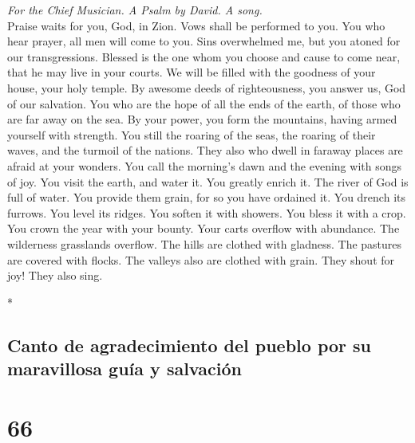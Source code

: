 \begin{paracol}{2}
\begin{otherlanguage}{english}
\emph{For the Chief Musician. A Psalm by David. A song.}\\
 Praise waits for you, God, in Zion. Vows shall be
performed to you.  You who hear prayer, all men will come
to you.  Sins overwhelmed me, but you atoned for our
transgressions.  Blessed is the one whom you choose and
cause to come near, that he may live in your courts. We will be filled
with the goodness of your house, your holy temple.  By
awesome deeds of righteousness, you answer us, God of our salvation. You
who are the hope of all the ends of the earth, of those who are far away
on the sea.  By your power, you form the mountains, having
armed yourself with strength.  You still the roaring of
the seas, the roaring of their waves, and the turmoil of the nations.
 They also who dwell in faraway places are afraid at your
wonders. You call the morning's dawn and the evening with songs of joy.
 You visit the earth, and water it. You greatly enrich it.
The river of God is full of water. You provide them grain, for so you
have ordained it.  You drench its furrows. You level its
ridges. You soften it with showers. You bless it with a crop.
 You crown the year with your bounty. Your carts overflow
with abundance.  The wilderness grasslands overflow. The
hills are clothed with gladness.  The pastures are
covered with flocks. The valleys also are clothed with grain. They shout
for joy! They also sing.

\end{otherlanguage}

\switchcolumn[0]*

\hypertarget{canto-de-agradecimiento-del-pueblo-por-su-maravillosa-guuxeda-y-salvaciuxf3n}{%
\subsection{Canto de agradecimiento del pueblo por su maravillosa guía y
salvación}\label{canto-de-agradecimiento-del-pueblo-por-su-maravillosa-guuxeda-y-salvaciuxf3n}}

\hypertarget{section-130}{%
\section{66}\label{section-130}}


\end{paracol}

